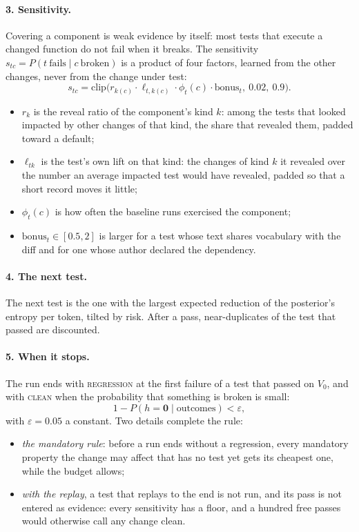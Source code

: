 \documentclass[11pt,a4paper]{article}
\newcommand{\clean}{\textsc{clean}}
\newcommand{\regression}{\textsc{regression}}
\begin{document}
\paragraph{3. Sensitivity.} Covering a component is weak evidence by itself: most tests that execute a changed
function do not fail when it breaks. The sensitivity $s_{tc} = P(t\ \text{fails} \mid c\ \text{broken})$ is a
product of four factors, learned from the other changes, never from the change under test:
\begin{equation}
  s_{tc} = \mathrm{clip}\big(r_{k(c)} \cdot \ell_{t,k(c)} \cdot \phi_t(c) \cdot \mathrm{bonus}_t,\ 0.02,\
  0.9\big).
  \label{eq:sens}
\end{equation}
\begin{itemize}
  \item $r_k$ is the reveal ratio of the component's kind $k$: among the tests that looked impacted by other
        changes of that kind, the share that revealed them, padded toward a default;
  \item $\ell_{tk}$ is the test's own lift on that kind: the changes of kind $k$ it revealed over the number an
        average impacted test would have revealed, padded so that a short record moves it little;
  \item $\phi_t(c)$ is how often the baseline runs exercised the component;
  \item $\mathrm{bonus}_t \in [0.5, 2]$ is larger for a test whose text shares vocabulary with the diff and for
        one whose author declared the dependency.
\end{itemize}

\paragraph{4. The next test.} The next test is the one with the largest expected reduction of the posterior's
entropy \cite{lindley1956measure} per token, tilted by risk. After a pass, near-duplicates of the test that passed
are discounted.

\paragraph{5. When it stops.} The run ends with \regression{} at the first failure of a test that passed on
$V_0$, and with \clean{} when the probability that something is broken is small:
\begin{equation}
  1 - P(h = \mathbf{0} \mid \text{outcomes}) < \varepsilon ,
  \label{eq:clean}
\end{equation}
with $\varepsilon = 0.05$ a constant. Two details complete the rule:
\begin{itemize}
  \item \emph{the mandatory rule}: before a run ends without a regression, every mandatory property the change
        may affect that has no test yet gets its cheapest one, while the budget allows;
  \item \emph{with the replay}, a test that replays to the end is not run, and its pass is not entered as
        evidence: every sensitivity has a floor, and a hundred free passes would otherwise call any change clean.
\end{itemize}
\end{document}
